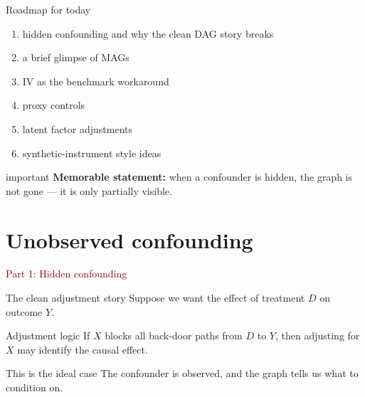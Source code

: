 \documentclass[dvipsnames,aspectratio=169,handout]{beamer}
\begin{document}
\begin{frame}{Roadmap for today}
\begin{enumerate}
    \item hidden confounding and why the clean DAG story breaks
    \item a brief glimpse of MAGs
    \item IV as the benchmark workaround
    \item proxy controls
    \item latent factor adjustments
    \item synthetic-instrument style ideas
\end{enumerate}

\vspace{2mm}
\begin{beamercolorbox}[wd=\textwidth,sep=7pt,center,rounded=true,shadow=true]{important}
\textbf{Memorable statement:}
when a confounder is hidden, the graph is not gone --- it is only partially visible.
\end{beamercolorbox}
\end{frame}


\section{Unobserved confounding}

\begin{frame}{}
\begin{center}
{\Huge \textcolor{DarkRed}{Part 1: Hidden confounding}}
\end{center}
\end{frame}

\begin{frame}{The clean adjustment story}
Suppose we want the effect of treatment $D$ on outcome $Y$.

\begin{center}
\end{center}

\begin{block}{Adjustment logic}
If $X$ blocks all back-door paths from $D$ to $Y$, then adjusting for $X$ may identify the causal effect.
\end{block}

\begin{alertblock}{This is the ideal case}
The confounder is observed, and the graph tells us what to condition on.
\end{alertblock}
\end{frame}
\end{document}

